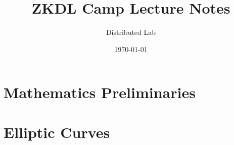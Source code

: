 \documentclass{zkdl-template}
\title{\huge\sffamily\bfseries ZKDL Camp Lecture Notes}
\author{\Large\sffamily Distributed Lab}
\date{\sffamily \today}
\begin{document}
\pagestyle{fancy}

\maketitle

\section{Mathematics Preliminaries}



\section{Elliptic Curves}


\end{document}
